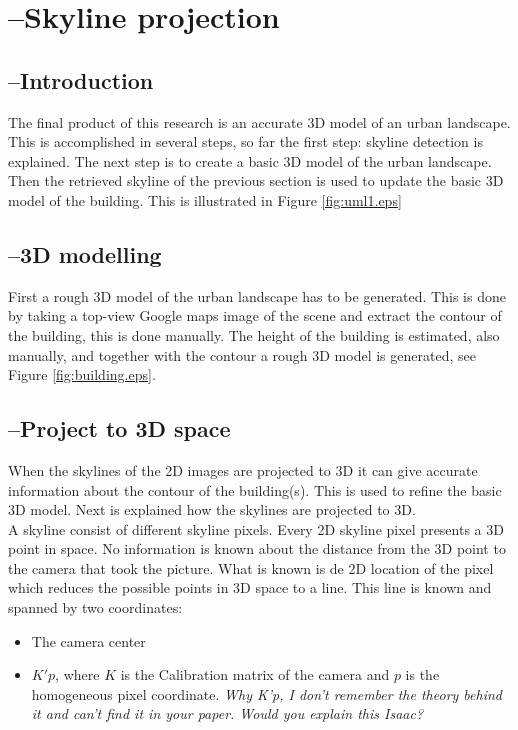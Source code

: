 \documentclass[10pt]{article}
\begin{document}
\section{--Skyline projection}
 \subsection{--Introduction}
The final product of this research is an accurate 3D model of an urban
landscape. This is accomplished in several steps, so far the first step: skyline detection is
explained. The next step is to create a basic 3D model of the urban landscape.
Then the retrieved skyline of the previous section is used to update the basic
3D model of the building. This is illustrated in Figure \ref{fig:uml1.eps}




   \subsection{--3D modelling}
First a rough 3D model of the urban landscape has to be generated. This is done
by taking a top-view Google maps image of the scene and extract the contour of
the building, this is done manually. 
The height of the building is estimated, also manually, and together with the
contour a rough 3D model is generated, see Figure \ref{fig:building.eps}. 


\subsection{--Project to 3D space}
When the skylines of the 2D images are projected to 3D it can give 
accurate information about the contour of the building(s). This is used to
refine the basic 3D model.  Next is explained how the skylines are projected to
3D.\\

A skyline consist of different skyline pixels. Every 2D skyline pixel presents a 3D point in space. No
information is known about the distance from the 3D point to the camera that
took the picture. What is known is de 2D location of the pixel which reduces the possible points in 3D
space to a line.  This line is known and spanned by two 
coordinates:\\ 
\begin{itemize}
	\item The camera center %
	\item $K'p$, where $K$ is the Calibration matrix of the camera and $p$ is the homogeneous pixel coordinate.
	\textit{Why K'p, I don't remember the theory behind it and can't find it in your paper. Would you explain this Isaac?}
\end{itemize}
\end{document}
